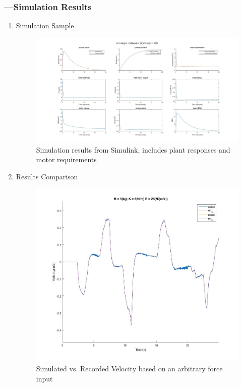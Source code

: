 \subsubsection*{---Simulation Results}
\begin{enumerate}
\item {Simulation Sample}
\begin{figure}[H]
\centering
\includegraphics[width=1\linewidth]{Images/Simulation}
\caption{Simulation results from Simulink, includes plant responses and motor requirements}
\label{fig:Simulation}
\end{figure}
\item{Results Comparison}
\begin{figure}[H]
\centering
\includegraphics[width=1\linewidth]{Images/ArbitraryInput}
\caption{Simulated vs. Recorded Velocity based on an arbitrary force input}
\label{fig:ArbitraryInput}
\end{figure}

\end{enumerate}